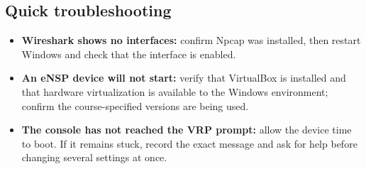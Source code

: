 \subsection{Quick troubleshooting}
\begin{itemize}
  \item \textbf{Wireshark shows no interfaces:} confirm Npcap was installed,
    then restart Windows and check that the interface is enabled.
  \item \textbf{An eNSP device will not start:} verify that VirtualBox is
    installed and that hardware virtualization is available to the Windows
    environment; confirm the course-specified versions are being used.
  \item \textbf{The console has not reached the VRP prompt:} allow the device
    time to boot. If it remains stuck, record the exact message and ask for
    help before changing several settings at once.
\end{itemize}
